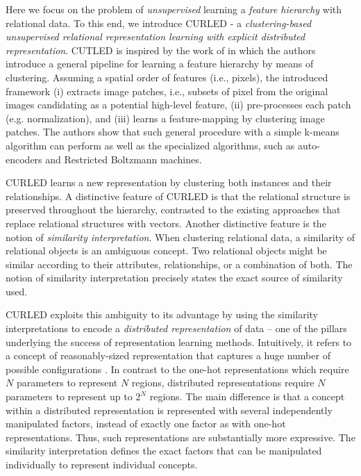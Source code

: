 Here we focus on the problem of \textit{unsupervised} learning a \textit{feature hierarchy} with relational data.
To this end, we introduce CURLED - a \textit{clustering-based unsupervised relational representation learning with explicit distributed representation}.
CUTLED is inspired by the work of \cite{coates2011analysis} in which the authors introduce a general pipeline for learning a feature hierarchy by means of clustering.
Assuming a spatial order of features (i.e., pixels), the introduced framework (i) extracts image patches, i.e., subsets of pixel from the original images candidating as a potential high-level feature, (ii) pre-processes each patch (e.g. normalization), and (iii) learns a feature-mapping by clustering image patches.
The authors show that such general procedure with a simple k-means algorithm can perform as well as the specialized algorithms, such as auto-encoders and  Restricted Boltzmann machines.


CURLED learns a new representation by clustering both instances and their relationships.
A distinctive feature of  CURLED is that the relational structure is  preserved throughout the hierarchy, contrasted to the existing approaches that replace relational structures with vectors.
Another distinctive feature is the notion of \textit{similarity interpretation}.
When clustering relational data, a similarity of relational objects is an ambiguous concept.
Two relational objects might be similar according to their attributes, relationships, or a combination of both.
The notion of similarity interpretation precisely states the exact source of similarity used.



CURLED exploits this ambiguity to its advantage by using the similarity interpretations to encode a \textit{distributed representation} of data -- one of the pillars underlying the success of representation learning methods.
Intuitively, it refers to a concept of  reasonably-sized representation that captures a huge number of possible configurations \cite{Bengio2013RLR}.
In contrast to the one-hot representations which require $N$ parameters to represent $N$ regions,  distributed representations require $N$ parameters to represent up to $2^N$ regions.
The main difference is that a concept within a distributed representation is represented with several independently manipulated factors, instead of exactly one factor as with one-hot representations.
Thus, such representations are substantially more expressive. 
The similarity interpretation defines the exact factors that can be manipulated individually to represent individual concepts.



